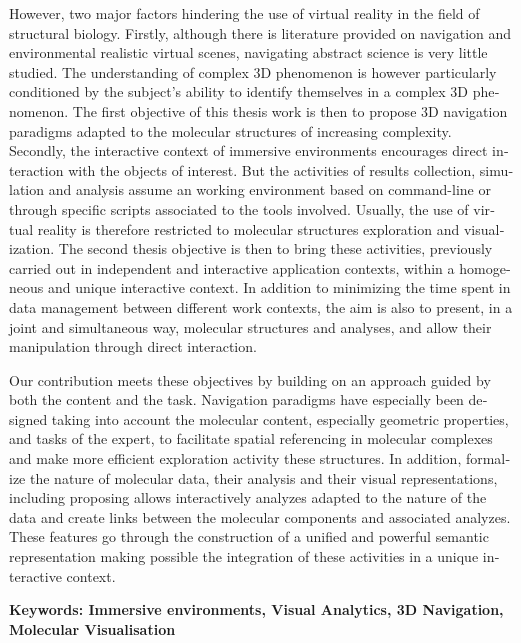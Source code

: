 \begin{otherlanguage}{english}
However, two major factors hindering the use of virtual reality in the field of structural biology. Firstly, although there is literature provided on navigation and environmental realistic virtual scenes, navigating abstract science is very little studied. The understanding of complex 3D phenomenon is however particularly conditioned by the subject's ability to identify themselves in a complex 3D phenomenon. The first objective of this thesis work is then to propose 3D navigation paradigms adapted to the molecular structures of increasing complexity. Secondly, the interactive context of immersive environments encourages direct interaction with the objects of interest. But the activities of results collection, simulation and analysis assume an working environment based on command-line or through specific scripts associated to the tools involved. Usually, the use of virtual reality is therefore restricted to molecular structures exploration and visualization. The second thesis objective is then to bring these activities, previously carried out in independent and interactive application contexts, within a homogeneous and unique interactive context. In addition to minimizing the time spent in data management between different work contexts, the aim is also to present, in a joint and simultaneous way, molecular structures and analyses, and allow their manipulation through direct interaction.

Our contribution meets these objectives by building on an approach guided by both the content and the task. Navigation paradigms have especially been designed taking into account the molecular content, especially geometric properties, and tasks of the expert, to facilitate spatial referencing in molecular complexes and make more efficient exploration activity these structures. In addition, formalize the nature of molecular data, their analysis and their visual representations, including proposing allows interactively analyzes adapted to the nature of the data and create links between the molecular components and associated analyzes. These features go through the construction of a unified and powerful semantic representation making possible the integration of these activities in a unique interactive context.

\textbf{Keywords: Immersive environments, Visual Analytics, 3D Navigation, Molecular Visualisation} 

\end{otherlanguage} 